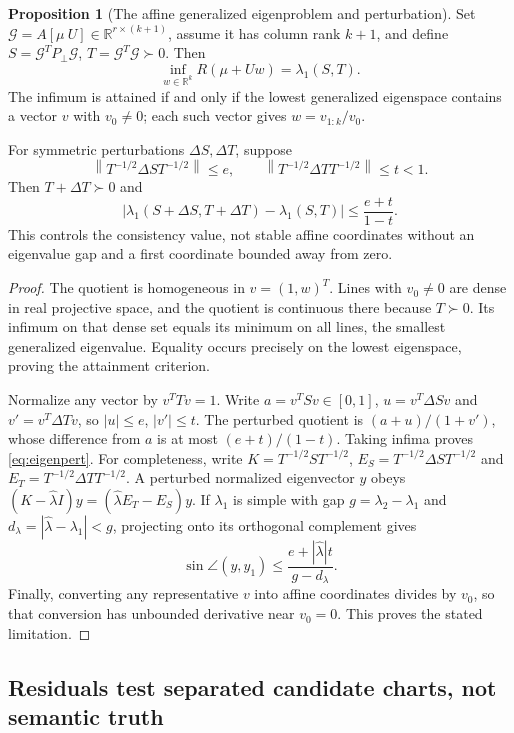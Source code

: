 \documentclass[11pt,a4paper]{article}
\theoremstyle{definition}
\newtheorem{proposition}[theorem]{Proposition}
\theoremstyle{definition}
\theoremstyle{remark}\newtheorem{remark}[theorem]{Remark}
\newcommand{\R}{\mathbb R}\newcommand{\Prob}{\mathbb P}\newcommand{\E}{\mathbb E}
\newcommand{\norm}[1]{\left\lVert #1\right\rVert}
\begin{document}
\begin{proposition}[The affine generalized eigenproblem and perturbation]\label{prop:eigen}
Set $\mathcal G=A[\mu\ U]\in\R^{r\times(k+1)}$, assume it has column rank $k+1$, and define $S=\mathcal G^TP_\perp\mathcal G$, $T=\mathcal G^T\mathcal G\succ0$. Then
\[
\inf_{w\in\R^k}R(\mu+Uw)=\lambda_1(S,T).
\]
The infimum is attained if and only if the lowest generalized eigenspace contains a vector $v$ with $v_0\ne0$; each such vector gives $w=v_{1:k}/v_0$.

For symmetric perturbations $\Delta S,\Delta T$, suppose
\[
\norm{T^{-1/2}\Delta S T^{-1/2}}\le e,
\qquad \norm{T^{-1/2}\Delta T T^{-1/2}}\le t<1.
\]
Then $T+\Delta T\succ0$ and
\begin{equation}\label{eq:eigenpert}
|\lambda_1(S+\Delta S,T+\Delta T)-\lambda_1(S,T)|\le\frac{e+t}{1-t}.
\end{equation}
This controls the consistency value, not stable affine coordinates without an eigenvalue gap and a first coordinate bounded away from zero.
\end{proposition}
\begin{proof}
The quotient is homogeneous in $v=(1,w)^T$. Lines with $v_0\ne0$ are dense in real projective space, and the quotient is continuous there because $T\succ0$. Its infimum on that dense set equals its minimum on all lines, the smallest generalized eigenvalue. Equality occurs precisely on the lowest eigenspace, proving the attainment criterion.

Normalize any vector by $v^TTv=1$. Write $a=v^TSv\in[0,1]$, $u=v^T\Delta Sv$ and $v'=v^T\Delta Tv$, so $|u|\le e$, $|v'|\le t$. The perturbed quotient is $(a+u)/(1+v')$, whose difference from $a$ is at most $(e+t)/(1-t)$. Taking infima proves \eqref{eq:eigenpert}. For completeness, write $K=T^{-1/2}ST^{-1/2}$, $E_S=T^{-1/2}\Delta ST^{-1/2}$ and $E_T=T^{-1/2}\Delta TT^{-1/2}$. A perturbed normalized eigenvector $y$ obeys
$(K-\widehat\lambda I)y=(\widehat\lambda E_T-E_S)y$.
If $\lambda_1$ is simple with gap $g=\lambda_2-\lambda_1$ and $d_\lambda=|\widehat\lambda-\lambda_1|<g$, projecting onto its orthogonal complement gives
\[
\sin\angle(y,y_1)\le\frac{e+|\widehat\lambda|t}{g-d_\lambda}.
\]
Finally, converting any representative $v$ into affine coordinates divides by $v_0$, so that conversion has unbounded derivative near $v_0=0$. This proves the stated limitation.
\end{proof}

\subsection{Residuals test separated candidate charts, not semantic truth}
\end{document}
